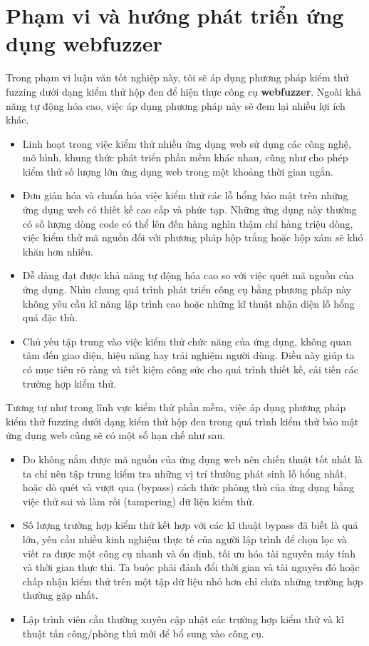 \section{Phạm vi và hướng phát triển ứng dụng webfuzzer}
Trong phạm vi luận văn tốt nghiệp này, tôi sẽ áp dụng phương pháp kiểm thử fuzzing dưới dạng kiểm thử hộp đen để hiện thực công cụ \textbf{webfuzzer}. Ngoài khả năng tự động hóa cao, việc áp dụng phương pháp này sẽ đem lại nhiều lợi ích khác.
\begin{itemize}
    \item Linh hoạt trong việc kiểm thử nhiều ứng dụng web sử dụng các công nghệ, mô hình, khung thức phát triển phần mềm khác nhau, cũng như cho phép kiểm thử số lượng lớn ứng dụng web trong một khoảng thời gian ngắn.
    \item Đơn giản hóa và chuẩn hóa việc kiểm thử các lỗ hổng bảo mật trên những ứng dụng web có thiết kế cao cấp và phức tạp. Những ứng dụng này thường có số lượng dòng code có thể lên đến hàng nghìn thậm chí hàng triệu dòng, việc kiểm thử mã nguồn đối với phương pháp hộp trắng hoặc hộp xám sẽ khó khăn hơn nhiều.
    \item Dễ dàng đạt được khả năng tự động hóa cao so với việc quét mã nguồn của ứng dụng. Nhìn chung quá trình phát triển công cụ bằng phương pháp này không yêu cầu kĩ năng lập trình cao hoặc những kĩ thuật nhận diện lỗ hổng quá đặc thù.
    \item Chủ yếu tập trung vào việc kiểm thử chức năng của ứng dụng, không quan tâm đến giao diện, hiệu năng hay trải nghiệm người dùng. Điều này giúp ta có mục tiêu rõ ràng và tiết kiệm công sức cho quá trình thiết kế, cải tiến các trường hợp kiểm thử. 
\end{itemize}
Tương tự như trong lĩnh vực kiểm thử phần mềm, việc áp dụng phương pháp kiểm thử fuzzing dưới dạng kiểm thử hộp đen trong quá trình kiểm thử bảo mật ứng dụng web cũng sẽ có một số hạn chế như sau.
\begin{itemize}
    \item Do không nắm được mã nguồn của ứng dụng web nên chiến thuật tốt nhất là ta chỉ nên tập trung kiểm tra những vị trí thường phát sinh lỗ hổng nhất, hoặc dò quét và vượt qua (bypass) cách thức phòng thủ của ứng dụng bằng việc thử sai và làm rối (tampering) dữ liệu kiểm thử.
    \item Số lượng trường hợp kiểm thử kết hợp với các kĩ thuật bypass đã biết là quá lớn, yêu cầu nhiều kinh nghiệm thực tế của người lập trình để chọn lọc và viết ra được một công cụ nhanh và ổn định, tối ưu hóa tài nguyên máy tính và thời gian thực thi. Ta buộc phải đánh đổi thời gian và tài nguyên đó hoặc chấp nhận kiểm thử trên một tập dữ liệu nhỏ hơn chỉ chứa những trường hợp thường gặp nhất.
    \item Lập trình viên cần thường xuyên cập nhật các trường hợp kiểm thử và kĩ thuật tấn công/phòng thủ mới để bổ sung vào công cụ.
\end{itemize}
